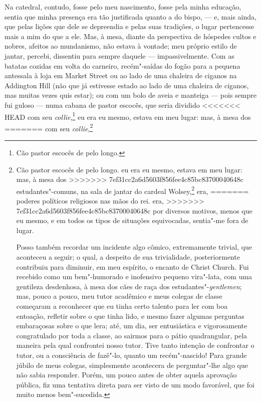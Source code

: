 {{{{{{{{{{{{{{{{{{{{{{{{{{{{{{{{{{{{{{{{{{{{{{{{{{{{{{{{{{{{{{{{{{{{{{{{{{{{{{{{{{{{{{{{{{{{{{{Na catedral, contudo, fosse pelo meu nascimento, fosse pela minha
educação, sentia que minha presença era tão justificada quanto a do
bispo, --- e, mais ainda, que pelas lições que dele se depreendia e pelas
suas tradições, o lugar pertencesse mais a mim do que a ele. Mas, à
mesa, diante da perspectiva de hóspedes cultos e nobres, afeitos ao
mundanismo, não estava à vontade; meu próprio estilo de jantar, percebi,
dissentiu para sempre daquele --- impassivelmente. Com as batatas cozidas
em volta do carneiro, recém"-saídas do fogão para a pequena antessala à
loja em Market Street ou ao lado de uma chaleira de ciganos na Addington
Hill (não que já estivesse estado ao lado de uma chaleira de ciganos,
mas muitas vezes quis estar); ou com um bolo de aveia e manteiga --- pois
sempre fui guloso --- numa cabana de pastor escocês, que seria dividido
<<<<<<< HEAD
com seu \textit{collie},\footnote{Cão pastor escocês de pelo longo.} eu era eu mesmo, estava em meu lugar: mas, à mesa dos
=======
com seu \textit{collie},\footnote{Cão pastor escocês de pelo longo.  eu era eu mesmo, estava em meu lugar: mas, à mesa dos
>>>>>>> 7ef31cc2a6d5603f856fee4c85bc83700040648c
estudantes"-comuns, na sala de jantar do cardeal Wolsey,\footnote{Thomas
  Wolsey (1471--1530): religioso e estadista inglês que desempenhou papel
  político essencial durante o reino de Henrique \textsc{viii}, empenhando"-se em
  manter a Inglaterra fora das guerras continentais e em centralizar os
<<<<<<< HEAD
  poderes políticos religiosos nas mãos do rei.} era,
=======
  poderes políticos religiosos nas mãos do rei.  era,
>>>>>>> 7ef31cc2a6d5603f856fee4c85bc83700040648c
por diversos motivos, menos que eu mesmo, e em todos os tipos de
situações equivocadas, sentia"-me fora de lugar.

Posso também recordar um incidente algo cômico, extremamente
trivial, que aconteceu a seguir; o qual, a despeito de sua trivialidade,
posteriormente contribuiu para diminuir, em meu espírito, o encanto de
Christ Church. Fui recebido como um bem"-humorado e inofensivo pequeno
vira"-lata, com uma gentileza desdenhosa, à mesa dos cães de raça dos
estudantes"-\textit{gentlemen}; mas, pouco a pouco, meu tutor acadêmico e
meus colegas de classe começaram a reconhecer que eu tinha certo talento
para ler com boa entoação, refletir sobre o que tinha lido, e mesmo
fazer algumas perguntas embaraçosas sobre o que lera; até, um dia, ser
entusiástica e vigorosamente congratulado por toda a classe, ao sairmos
para o pátio quadrangular, pela maneira pela qual confrontei nosso
tutor. Tive tanto intenção de confrontar o tutor, ou a consciência de
fazê"-lo, quanto um recém"-nascido! Para grande júbilo de meus colegas,
simplesmente acontecera de perguntar"-lhe algo que não sabia responder.
Porém, um pouco antes de obter aquela aprovação pública, fiz uma
tentativa direta para ser visto de um modo favorável, que foi muito
menos bem"-sucedida.

}}}}}}}}}}}}}}}}}}}}}}}}}}}}}}}}}}}}}}}}}}}}}}}}}}}}}}}}}}}}}}}}}}}}}}}}}}}}}}}}}}}}}}}}}}}}}}}}
